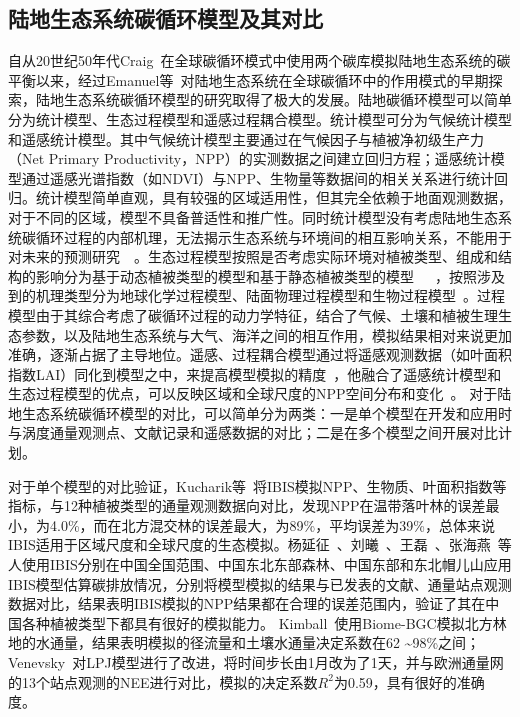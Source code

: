 \subsection{陆地生态系统碳循环模型及其对比}
自从20世纪50年代Craig~\cite{craig1957natural}在全球碳循环模式中使用两个碳库模拟陆地生态系统的碳平衡以来，经过Emanuel等~\cite{emanuel1985climatic}对陆地生态系统在全球碳循环中的作用模式的早期探索，陆地生态系统碳循环模型的研究取得了极大的发展。陆地碳循环模型可以简单分为统计模型、生态过程模型和遥感过程耦合模型。统计模型可分为气候统计模型和遥感统计模型。其中气候统计模型主要通过在气候因子与植被净初级生产力（Net Primary Productivity，NPP）的实测数据之间建立回归方程；遥感统计模型通过遥感光谱指数（如NDVI）与NPP、生物量等数据间的相关关系进行统计回归。统计模型简单直观，具有较强的区域适用性，但其完全依赖于地面观测数据，对于不同的区域，模型不具备普适性和推广性。同时统计模型没有考虑陆地生态系统碳循环过程的内部机理，无法揭示生态系统与环境间的相互影响关系，不能用于对未来的预测研究~\cite{2014-yuanwenping}~\cite{xieqinyao}。生态过程模型按照是否考虑实际环境对植被类型、组成和结构的影响分为基于动态植被类型的模型和基于静态植被类型的模型~\cite{2008-wangshaogang}~\cite{2009-wangping}~\cite{2006-maoliuxi}，按照涉及到的机理类型分为地球化学过程模型、陆面物理过程模型和生物过程模型~\cite{xieqinyao}。过程模型由于其综合考虑了碳循环过程的动力学特征，结合了气候、土壤和植被生理生态参数，以及陆地生态系统与大气、海洋之间的相互作用，模拟结果相对来说更加准确，逐渐占据了主导地位。遥感、过程耦合模型通过将遥感观测数据（如叶面积指数LAI）同化到模型之中，来提高模型模拟的精度~\cite{zhangyanlong-c}，他融合了遥感统计模型和生态过程模型的优点，可以反映区域和全球尺度的NPP空间分布和变化~\cite{zhuwenquan-2005}。
对于陆地生态系统碳循环模型的对比，可以简单分为两类：一是单个模型在开发和应用时与涡度通量观测点、文献记录和遥感数据的对比；二是在多个模型之间开展对比计划。

对于单个模型的对比验证，Kucharik等~\cite{Kucharik2000Testing}将IBIS模拟NPP、生物质、叶面积指数等指标，与12种植被类型的通量观测数据向对比，发现NPP在温带落叶林的误差最小，为4.0\%，而在北方混交林的误差最大，为89\%，平均误差为39\%，总体来说IBIS适用于区域尺度和全球尺度的生态模拟。杨延征~\cite{2016-yangyanzheneg-b}、刘曦~\cite{2011-liuxi-IBIS}、王磊~\cite{leiwang}、张海燕~\cite{haiyanzhang-2009}等人使用IBIS分别在中国全国范围、中国东北东部森林、中国东部和东北帽儿山应用IBIS模型估算碳排放情况，分别将模型模拟的结果与已发表的文献、通量站点观测数据对比，结果表明IBIS模拟的NPP结果都在合理的误差范围内，验证了其在中国各种植被类型下都具有很好的模拟能力。
Kimball~\cite{kimball1997biome}使用Biome-BGC模拟北方林地的水通量，结果表明模拟的径流量和土壤水通量决定系数在62 \textasciitilde 98\%之间；Venevsky~\cite{venevsky2007sever}对LPJ模型进行了改进，将时间步长由1月改为了1天，并与欧洲通量网的13个站点观测的NEE进行对比，模拟的决定系数$R^2$为0.59，具有很好的准确度。

